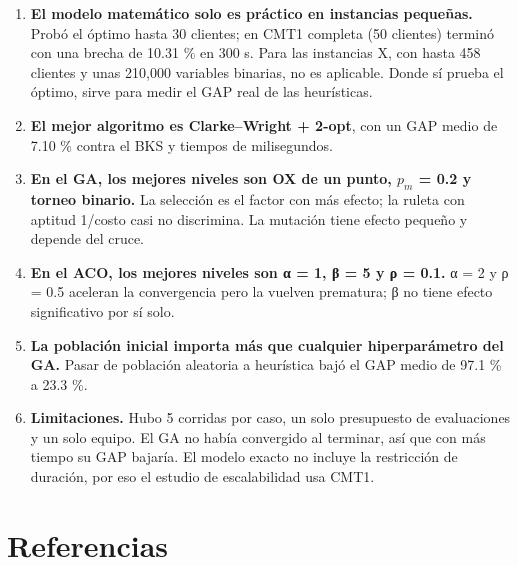\documentclass[11pt,letterpaper]{article}
\providecommand{\tightlist}{\setlength{\itemsep}{0pt}\setlength{\parskip}{0pt}}
\begin{document}
\begin{enumerate}
\def\labelenumi{\arabic{enumi}.}
\tightlist
\item
  \textbf{El modelo matemático solo es práctico en instancias pequeñas.} Probó el óptimo hasta 30 clientes; en CMT1 completa (50 clientes) terminó con una brecha de 10.31 \% en 300 s. Para las instancias X, con hasta 458 clientes y unas 210,000 variables binarias, no es aplicable. Donde sí prueba el óptimo, sirve para medir el GAP real de las heurísticas.
\item
  \textbf{El mejor algoritmo es Clarke--Wright + 2-opt}, con un GAP medio de 7.10 \% contra el BKS y tiempos de milisegundos.
\item
  \textbf{En el GA, los mejores niveles son OX de un punto, \(p_{m}\) = 0.2 y torneo binario.} La selección es el factor con más efecto; la ruleta con aptitud 1/costo casi no discrimina. La mutación tiene efecto pequeño y depende del cruce.
\item
  \textbf{En el ACO, los mejores niveles son α = 1, β = 5 y ρ = 0.1.} α = 2 y ρ = 0.5 aceleran la convergencia pero la vuelven prematura; β no tiene efecto significativo por sí solo.
\item
  \textbf{La población inicial importa más que cualquier hiperparámetro del GA.} Pasar de población aleatoria a heurística bajó el GAP medio de 97.1 \% a 23.3 \%.
\item
  \textbf{Limitaciones.} Hubo 5 corridas por caso, un solo presupuesto de evaluaciones y un solo equipo. El GA no había convergido al terminar, así que con más tiempo su GAP bajaría. El modelo exacto no incluye la restricción de duración, por eso el estudio de escalabilidad usa CMT1.
\end{enumerate}

\hypertarget{referencias}{%
\section*{Referencias}\label{referencias}}
\end{document}

